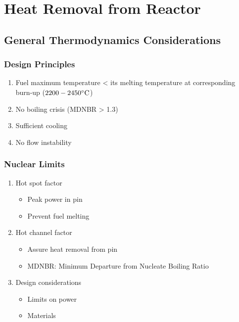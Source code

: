 \section{Heat Removal from Reactor}

\subsection{General Thermodynamics Considerations}

\subsubsection*{Design Principles}

\begin{enumerate}
    \item Fuel maximum temperature < its melting temperature at corresponding burn-up ($2200 - 2450 {}^{\circ}{\rm C}$)
    \item No boiling crisis (MDNBR > 1.3)
    \item Sufficient cooling
    \item No flow instability
\end{enumerate}

\subsubsection*{Nuclear Limits}

\begin{enumerate}
    \item Hot spot factor
    \begin{itemize}
        \item Peak power in pin
        \item Prevent fuel melting
    \end{itemize}
    \item Hot channel factor
    \begin{itemize}
        \item Assure heat removal from pin
        \item MDNBR: Minimum Departure from Nucleate Boiling Ratio
    \end{itemize}
    \item Design considerations
    \begin{itemize}
        \item Limits on power
        \item Materials
    \end{itemize}
\end{enumerate}

